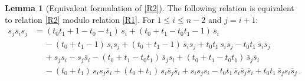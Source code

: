 \documentclass[12pt,reqno]{amsart}
\theoremstyle{definition}
\newtheorem{lemma}[theorem]{Lemma}
\def\be{\begin{equation}}
\def\ee{\end{equation}}
\def\hs{\overline{s}}
\begin{document}
\begin{lemma}[Equivalent formulation of \eqref{R2}]\label{equivR2}
The following relation is equivalent to relation \eqref{R2} modulo relation
\eqref{R1}. For $1\leq i\leq n-2$ and $j=i+1$:
\be\label{modR2}
\begin{aligned}
s_j \hs_i s_j& = (t_0 t_1 +1 -t_0 -t_1) \, s_i + (t_0 + t_1 - t_0 t_1 -1) \, \hs_i \\
& \phantom{sii}- (t_0 + t_1 -1) \, s_i s_j + (t_0 + t_1 -1) \,
\hs_i s_j + t_0 t_1 \, s_i \hs_j - t_0 t_1 \, \hs_i \hs_j \\
&\phantom{sii} + s_j s_i - s_j \hs_i - (t_0 + t_1 - t_0 t_1) \,
\hs_j s_i + (t_0 + t_1 - t_0 t_1) \, \hs_j \hs_i \\
&\phantom{sii} - (t_0 + t_1) \, s_i s_j \hs_i + (t_0 + t_1) \,
s_i \hs_j \hs_i + s_i s_j s_i - t_0 t_1 \, \hs_i \hs_j \hs_i %
+ t_0 t_1 \, \hs_j s_i \hs_j \,.
\end{aligned}
\ee
\end{lemma}
\end{document}
